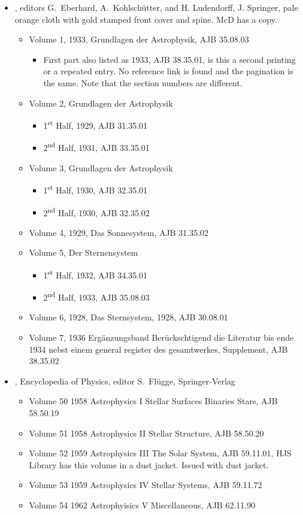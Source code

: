 \begin{itemize}
\item {}, editors G.\ Eberhard,
  A.\ Kohlschütter, and H. Ludendorff, J. Springer, pale orange
  cloth with gold stamped front cover and spine. McD has a copy.
  \begin{itemize}
  \item Volume 1, 1933, Grundlagen der Astrophysik, AJB 35.08.03
    \begin{itemize}
    \item First part also listed as 1933, AJB 38.35.01, is this a
      second printing or a repeated entry.  No reference link is found
      and the pagination is the same. Note that the section numbers
      are different.
      \end{itemize}
  \item Volume 2, Grundlagen der Astrophysik
    \begin{itemize}
    \item 1\textsuperscript{st} Half, 1929, AJB 31.35.01
    \item 2\textsuperscript{nd} Half, 1931, AJB 33.35.01
    \end{itemize}
  \item Volume 3, Grundlagen der Astrophysik
    \begin{itemize}
    \item 1\textsuperscript{st} Half, 1930, AJB 32.35.01
    \item 2\textsuperscript{nd} Half, 1930, AJB 32.35.02
    \end{itemize}
  \item Volume 4, 1929,  Das Sonnesystem, AJB 31.35.02
  \item Volume 5, Der Sternensystem
    \begin{itemize}
    \item 1\textsuperscript{st} Half, 1932, AJB 34.35.01
    \item 2\textsuperscript{nd} Half, 1933, AJB 35.08.03
    \end{itemize}
  \item Volume 6, 1928, Das Sternsystem, 1928, AJB 30.08.01
  \item Volume 7, 1936 Erg\"{a}nzungsband Ber\"{u}ckschtigend die
    Literatur bis ende 1934 nebst einem general register des
    gesamtwerkes, Supplement, AJB 38.35.02
  \end{itemize}

\item {}, Encyclopedia of Physics, editor
  S.\ Fl\"{u}gge, Springer-Verlag
  \begin{itemize}
  \item Volume 50 1958 Astrophysics I Stellar Surfaces Binaries Stars,
    AJB 58.50.19
  \item Volume 51 1958 Astrophysics II Stellar Structure, AJB 58.50.20
  \item Volume 52 1959 Astrophysics III The Solar System, AJB
    59.11.01, HJS Library has this volume in a dust jacket. Issued
    with dust jacket.
  \item Volume 53 1959 Astrophysics IV Stellar Systems, AJB 59.11.72
  \item Volume 54 1962 Astrophyisics V Miscellaneous, AJB 62.11.90


\end{itemize}
\end{itemize}
